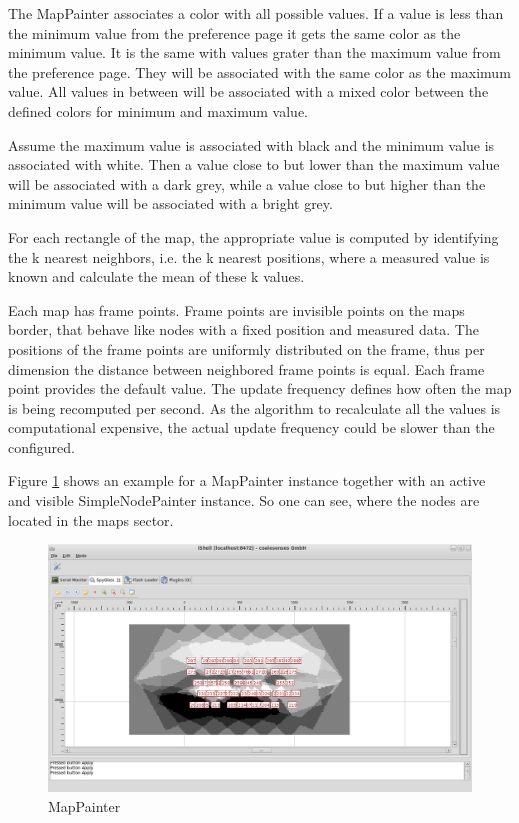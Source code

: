 The MapPainter associates a color with all possible values. If a value is less than the minimum value from the
preference page it gets the same color as the minimum value. It is the same with values grater than the maximum
value from the preference page. They will be associated with the same color as the maximum value. All values
in between will be associated with a mixed color between the defined colors for minimum and maximum value.

Assume the maximum value is associated with black and the minimum value is associated with white. Then a
value close to but lower than the maximum value will be associated with a dark grey, while a value close to
but higher than the minimum value will be associated with a bright grey.

For each rectangle of the map, the appropriate value is computed by identifying the k nearest neighbors,
i.e. the k nearest positions, where a measured value is known and calculate the mean of these k values.

Each map has frame points. Frame points are invisible points on the maps border, that behave like nodes with
a fixed position and measured data. The positions of the frame points are uniformly distributed on the frame, thus
per dimension the distance between neighbored frame points is equal. Each frame point provides the
default value. The update frequency defines how often the map is being recomputed per second. As the algorithm
to recalculate all the values is computational expensive, the actual update frequency could be slower than the
configured.

Figure \ref{pic:mp} shows an example for a MapPainter instance together with an active and visible SimpleNodePainter
instance. So one can see, where the nodes are located in the maps sector.

\begin{figure}[htb]
  \begin{center}
    \includegraphics[width=13.2cm]{./pics/mappainter}
    \caption{MapPainter}
    \label{pic:mp}
  \end{center}
\end{figure}

